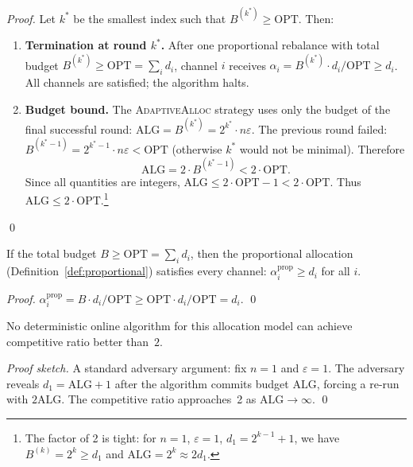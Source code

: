 \documentclass[11pt]{article}
\providecommand{\Alloc}{\alpha}                %
\providecommand{\OPT}{\mathrm{OPT}}           %
\providecommand{\ALG}{\mathrm{ALG}}           %
\providecommand{\AdaptAlloc}{\textsc{AdaptiveAlloc}}   %
\begin{document}
\begin{proof}
Let $k^*$ be the smallest index such that $B^{(k^*)} \ge \OPT$.
Then:
\begin{enumerate}[label=(\arabic*)]
  \item \textbf{Termination at round $k^*$.}
    After one proportional rebalance with total budget
    $B^{(k^*)} \ge \OPT = \sum_i d_i$, channel $i$ receives
    $\Alloc_i = B^{(k^*)} \cdot d_i / \OPT \ge d_i$.
    All channels are satisfied; the algorithm halts.
  \item \textbf{Budget bound.}
    The \AdaptAlloc{} strategy uses only the budget of the final
    successful round: $\ALG = B^{(k^*)} = 2^{k^*} \cdot n\varepsilon$.
    The previous round failed: $B^{(k^*-1)} = 2^{k^*-1} \cdot n\varepsilon < \OPT$
    (otherwise $k^*$ would not be minimal).
    Therefore
    \[
      \ALG = 2 \cdot B^{(k^*-1)} < 2 \cdot \OPT.
    \]
    Since all quantities are integers, $\ALG \le 2 \cdot \OPT - 1 < 2 \cdot \OPT$.
    Thus $\ALG \le 2 \cdot \OPT$.\footnote{
      The factor of 2 is tight: for $n = 1$,
      $\varepsilon = 1$, $d_1 = 2^{k-1} + 1$, we have
      $B^{(k)} = 2^k \ge d_1$ and $\ALG = 2^k \approx 2d_1$.}
\end{enumerate}
\qed
\end{proof}

\begin{corollary}\label{thm:feasibility}
If the total budget $B \ge \OPT = \sum_i d_i$, then the proportional
allocation (Definition~\ref{def:proportional}) satisfies every channel:
$\Alloc_i^{\mathrm{prop}} \ge d_i$ for all $i$.
\end{corollary}

\begin{proof}
$\Alloc_i^{\mathrm{prop}} = B \cdot d_i / \OPT \ge \OPT \cdot d_i / \OPT = d_i$. \qed
\end{proof}

\begin{corollary}\label{cor:lower}
No deterministic online algorithm for this allocation model can
achieve competitive ratio better than~$2$.
\end{corollary}

\begin{proof}[Proof sketch]
A standard adversary argument: fix $n = 1$ and $\varepsilon = 1$.
The adversary reveals $d_1 = \ALG + 1$ after the algorithm commits
budget $\ALG$, forcing a re-run with $2\ALG$.  The competitive ratio
approaches~2 as $\ALG \to \infty$. \qed
\end{proof}
\end{document}
